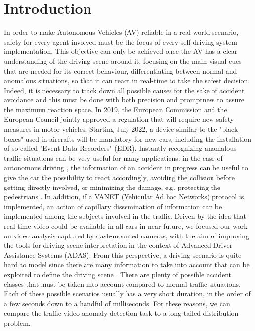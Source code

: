 \section{Introduction}

In order to make Autonomous Vehicles (AV) reliable in a real-world scenario, safety for every agent involved must be the focus of every self-driving system implementation.
This objective can only be achieved once the AV has a clear understanding of the driving scene around it, focusing on the main visual cues that are needed for its correct behaviour, differentiating between normal and anomalous situations, so that it can react in real-time to take the safest decision.
Indeed, it is necessary to track down all possible causes for the sake of accident avoidance and this must be done with both precision and promptness to assure the maximum reaction space.
In 2019, the European Commission and the European Council jointly approved a regulation that will require new safety measures in motor vehicles.
Starting July 2022, a device similar to the "black boxes" used in aircrafts will be mandatory for new cars, including the installation of so-called "Event Data Recorders" (EDR).
Instantly recognizing anomalous traffic situations can be very useful for many applications:
in the case of autonomous driving \cite{codevilla2019exploring}, the information of an accident in progress can be useful to give the car the possibility to react accordingly, avoiding the collision before getting directly involved, or minimizing the damage, e.g. protecting the pedestrians \cite{4298901}.
In addition, if a VANET (Vehicular Ad hoc Networks) protocol \cite{fatemidokht2021efficient} is implemented, an action of capillary dissemination of information can be implemented among the subjects involved in the traffic.
Driven by the idea that real-time video could be available in all cars in near future, we focused our work on video analysis captured by dash-mounted cameras, with the aim of improving the tools for driving scene interpretation in the context of Advanced Driver Assistance Systems (ADAS).
From this perspective, a driving scenario is quite hard to model since there are many information to take into account that can be exploited to define the driving scene  .
There are plenty of possible accident classes that must be taken into account compared to normal traffic situations.
Each of these possible scenarios usually has a very short duration, in the order of a few seconds down to a handful of milliseconds.
For these reasons, we can compare the traffic video anomaly detection task to a long-tailed distribution problem.

